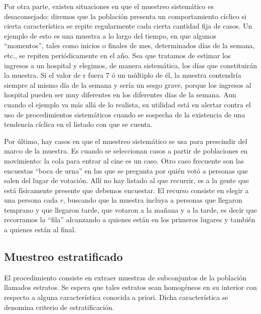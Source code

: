 \documentclass[]{book}
\begin{document}
Por otra parte, existen situaciones en que el muestreo sistemático es
desaconsejado: diremos que la población presenta un comportamiento
cíclico si cierta característica se repite regularmente cada cierta
cantidad fija de casos. Un ejemplo de esto es una muestra a lo largo del
tiempo, en que algunos ``momentos'', tales como inicios o finales de mes,
determinados días de la semana, etc., se repiten periódicamente en el
año. Sea que tratamos de estimar los ingresos a un hospital y elegimos, de manera sistemática, los días que constituirán la muestra. Si el valor de r fuera 7 ó un múltiplo de él, la muestra contendría siempre al mismo día de la semana y sería un sesgo grave, porque los ingresos al hospital pueden ser muy diferentes en los diferentes días de la semana. Aun cuando el ejemplo va más allá de lo realista, su utilidad está en alertar contra el uso de procedimientos sistemáticos cuando se sospecha de la existencia de una tendencia cíclica en el listado con que se cuenta.

Por último, hay casos en que el muestreo sistemático se usa para
prescindir del marco de la muestra. Es cuando se seleccionan casos a
partir de poblaciones en movimiento: la cola para entrar al cine es un
caso. Otro caso frecuente son las encuestas ``boca de urna'' en las que se
pregunta por quién votó a personas que salen del lugar de votación. Allí
no hay listado al que recurrir, es a la gente que está físicamente
presente que debemos encuestar. El recurso consiste en elegir a una
persona cada \(r\), buscando que la muestra incluya a personas que llegaron temprano y que llegaron tarde, que votaron a la mañana y a la tarde, es decir que recorramos la ``fila'' alcanzando a quienes están en los primeros lugares y también a quienes están al final.

\hypertarget{muestreo-estratificado}{%
\subsection{Muestreo estratificado}\label{muestreo-estratificado}}

El procedimiento consiste en extraer muestras de subconjuntos de la
población llamados estratos. Se espera que tales estratos sean
homogéneos en su interior con respecto a alguna característica conocida
a priori. Dicha característica se denomina criterio de estratificación.
\end{document}
